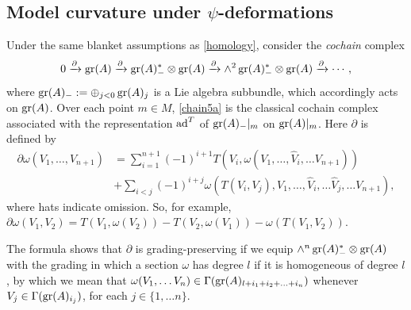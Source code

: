 \documentclass[leqno,12pt]{amsart} %
\newcommand{\rightpartial}[1]{\xrightarrow{\partial^{#1}}}
\begin{document}
\subsection{Model curvature under $\psi$-deformations}\label{curv_deform}
Under the same blanket assumptions as \ref{homology}, consider the {\em cochain} complex
\begin{equation}
  \label{chain5a} 0 \rightpartial{}  \graded(A)
  \rightpartial{} \graded(A)_{-}^* \otimes \graded(A)
  \rightpartial{} \wedge^2 \graded(A)_{-}^* \otimes \graded(A) \rightpartial{} \cdots,
\end{equation}
where $\operatorname{\operatorname{gr}}(A)_{-}:=\oplus_{j<0} \operatorname{\operatorname{gr}}(A)_j$ is a Lie algebra subbundle, which
accordingly acts on $\operatorname{\operatorname{gr}}(A)$.  Over each point $m \in M$, \eqref{chain5a} is the
classical cochain complex associated with the representation $\operatorname{ad}^T$ of
$\operatorname{\operatorname{gr}}(A)_{-}|_m$ on $\operatorname{\operatorname{gr}}(A)|_m$. Here $\partial$ is defined by
\begin{align*}
  \partial \omega (V_1, \ldots, V_{n+1}) &=
  \sum_{i=1}^{n+1}(-1)^{i+1}T(V_i, \omega(V_1, \ldots, \hat V_i, \ldots V_{n+1}))\\
  &+ \sum_{i<j}(-1)^{i+j}\omega(T(V_i,V_j), V_1,\ldots, \hat V_i, \ldots \hat V_j, \ldots V_{n+1}),
\end{align*}
where hats indicate omission. So, for example,
$\partial \omega(V_1, V_2) = T(V_1, \omega(V_2)) - T(V_2, \omega(V_1)) - \omega(T(V_1,
V_2))$.

The formula shows that $\partial$ is grading-preserving if we equip
$\wedge^n \operatorname{\operatorname{gr}}(A)_{-}^*\otimes \operatorname{\operatorname{gr}}(A)$ with the grading in which a section
$\omega $ has degree $l$ if it is homogeneous of degree $l$, by which we mean that
$\omega(V_1, \ldots V_n)\in \Gamma(\operatorname{\operatorname{gr}}(A)_{l+i_1+i_2+\ldots+i_n})$ whenever
$V_j \in \Gamma(\operatorname{\operatorname{gr}}(A)_{i_j})$, for each $j \in \{1, \ldots n\}$.
\end{document}
